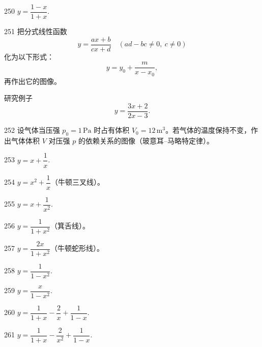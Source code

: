 \begin{prob}[S]{250}
$y = \dfrac{1 - x}{1 + x}$.
\end{prob}

\begin{prob}[M]{251}
把分式线性函数
\[
y = \frac{ax + b}{cx + d} \quad (ad - bc \neq 0,\ c \neq 0)
\]
化为以下形式：
\[
y = y_0 + \frac{m}{x - x_0},
\]
再作出它的图像。

研究例子
\[
y = \frac{3x + 2}{2x - 3}.
\]
\end{prob}

\begin{prob}[M]{252}
设气体当压强 $p_0 = 1\,\mathrm{Pa}$ 时占有体积 $V_0 = 12\,\mathrm{m^3}$。若气体的温度保持不变，作出气体体积 $V$ 对压强 $p$ 的依赖关系的图像（玻意耳--马略特定律）。
\end{prob}


\begin{prob}[S]{253}
$y = x + \dfrac{1}{x}$.
\end{prob}

\begin{prob}[S]{254}
$y = x^2 + \dfrac{1}{x}$（牛顿三叉线）。
\end{prob}

\begin{prob}[S]{255}
$y = x + \dfrac{1}{x^2}$.
\end{prob}

\begin{prob}[S]{256}
$y = \dfrac{1}{1 + x^2}$（箕舌线）。
\end{prob}

\begin{prob}[S]{257}
$y = \dfrac{2x}{1 + x^2}$（牛顿蛇形线）。
\end{prob}

\begin{prob}[S]{258}
$y = \dfrac{1}{1 - x^2}$.
\end{prob}

\begin{prob}[S]{259}
$y = \dfrac{x}{1 - x^2}$.
\end{prob}

\begin{prob}[S]{260}
$y = \dfrac{1}{1 + x} - \dfrac{2}{x} + \dfrac{1}{1 - x}$.
\end{prob}

\begin{prob}[S]{261}
$y = \dfrac{1}{1 + x} - \dfrac{2}{x^2} + \dfrac{1}{1 - x}$.
\end{prob}

